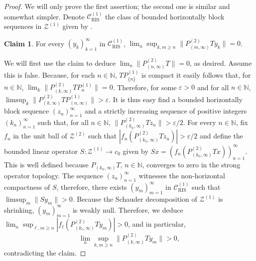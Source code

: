 \documentclass[11pt]{amsart}
\theoremstyle{definition}
\newtheorem*{claim}{Claim}
\newcommand{\N}{\mathbb{N}}
\newcommand{\e}{\varepsilon}
\numberwithin{equation}{section}
\begin{document}
\begin{proof}
We will only prove the first assertion; the second one is similar and somewhat simpler. Denote $\mathcal{C}^{(1)}_\mathrm{RIS}$ the class of bounded horizontally block sequences in $\mathcal{Z}^{(1)}$ given by .
\begin{claim}
For every $(y_k)_{k=1}^\infty$ in $\mathcal{C}^{(1)}_\mathrm{RIS}$, $\lim_n\sup_{k,m\geq n}\|P^{(2)}_{(m,\infty)}Ty_k\| = 0$.
\end{claim}
We will first use the claim to deduce $\lim_n\|P^{(2)}_{(n,\infty)}T\| = 0$, as desired. Assume this is false. Because, for each $n\in\N$, $TP_{\{n\}}^{(1)}$ is compact it easily follows that, for $n\in\N$, $\lim_k\|P_{(k,\infty)}^{(2)}TP_n^{(1)}\| = 0$. Therefore, for some $\e>0$ and for all $n\in\N$, $\limsup_k\|P^{(2)}_{(k,\infty)}TP^{(1)}_{(n,\infty)}\| >\e$. It is thus easy  find a bounded horizontally block sequence $(z_n)_{n=1}^\infty$ and a strictly increasing sequence of positive integers $(k_n)_{n=1}^\infty$ such that, for all $n\in\N$, $\|P^{(2)}_{(k_n,\infty)}Tz_n\| > \e/2$. For every $n\in\N$, fix $f_n$ in the unit ball of $\mathcal{Z}^{(2)}$ such that $|f_n(P^{(2)}_{(k_n,\infty)}Tz_n)| > \e/2$ and define the bounded linear operator $S:\mathcal{Z}^{(1)}\to c_0$ given by $Sx = (f_n(P^{(2)}_{(k_n,\infty)}Tx))_{n=1}^\infty$. This is well defined because $P_{(k_n,\infty)}T$, $n\in\N$, converges to zero in the strong operator topology. The sequence $(z_n)_{n=1}^\infty$ witnesses the non-horizontal compactness of $S$, therefore, there exists $(y_m)_{m=1}^\infty$ in $\mathcal{C}^{(1)}_\mathrm{RIS}$ such that $\limsup_m\|Sy_m\| >0$. Because the Schauder decomposition of $\mathcal{Z}^{(1)}$ is shrinking, $(y_m)_{m=1}^\infty$ is weakly null. Therefore, we deduce $\lim_n\sup_{\ell,m\geq n}|f_\ell(P_{(k_\ell,\infty)}^{(2)}Ty_m)| > 0$, and in particular,
\[\lim_n\sup_{k,m\geq n}\|P_{(k,\infty)}^{(2)}Ty_m  \| > 0,\]
contradicting the claim.


\end{proof}
\end{document}
